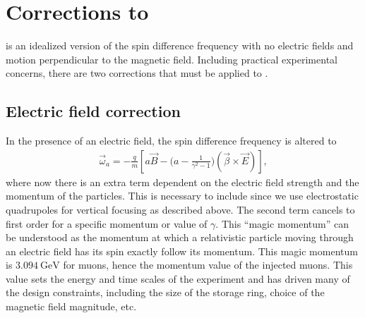 \section{Corrections to \texorpdfstring{\wa}{wa}}

 is an idealized version of the spin difference frequency with no electric fields and motion perpendicular to the magnetic field. Including practical experimental concerns, there are two corrections that must be applied to \wa.

\subsection{Electric field correction}
\label{sub:electric_field_correction}

In the presence of an electric field, the spin difference frequency is altered to 
        \begin{align} \label{eq:waelectric}
            \vec{\omega}_{a} = -\frac{q}{m} [a\vec{B} - \Big(a - \frac{1}{\gamma^{2}-1}\Big)(\vec{\beta} \times \vec{E}) ],
        \end{align}
where now there is an extra term dependent on the electric field strength and the momentum of the particles. This is necessary to include since we use electrostatic quadrupoles for vertical focusing as described above. The second term cancels to first order for a specific momentum or value of $\gamma$. This ``magic momentum'' can be understood as the momentum at which a relativistic particle moving through an electric field has its spin exactly follow its momentum. This magic momentum is $\SI{3.094}{\GeV}$ for muons, hence the momentum value of the injected muons. This value sets the energy and time scales of the experiment and has driven many of the design constraints, including the size of the storage ring, choice of the magnetic field magnitude, etc.

